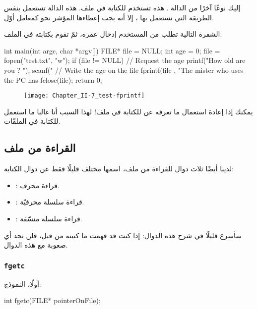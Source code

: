 إليك نوعًا آخرًا من الدالة
.
هذه تستخدم للكتابة في ملف. هذه الدالة تستعمل بنفس الطريقة التي نستعمل بها
،
إلا أنه يجب إعطاءها المؤشر نحو
كمعامل أوّل.

الشفرة التالية تطلب من المستخدم إدخال عمره، ثمّ تقوم بكتابته في الملف:

\begin{Csource}
int main(int argc, char *argv[])
{
	FILE* file = NULL;
	int age = 0;
	file = fopen("test.txt", "w");
	if (file != NULL)
	{
    		// Request the age
    		printf("How old are you ? ");
    		scanf("%
    		// Write the age on the file
    		fprintf(file , "The mister who uses the PC has %
    		fclose(file);
	}
 	return 0;
 }
\end{Csource}

\begin{figure}[H]
	\centering
	\texttt{[image: Chapter\_II-7\_test-fprintf]}
\end{figure}

يمكنك إذا إعادة استعمال ما تعرفه عن
للكتابة في ملف! لهذا السبب أنا غالبا ما استعمل
للكتابة في الملفّات.

\subsection{القراءة من ملف}

لدينا أيضًا ثلاث دوال للقراءة من ملف، اسمها مختلف قليلًا فقط عن دوال الكتابة:

\begin{itemize}
  \item {}:
 قراءة محرف.
  \item {}:
قراءة سلسلة محرفيّة.
  \item {}:
قراءة سلسلة منسّقة.
\end{itemize}

سأسرع قليلًا في شرح هذه الدوال: إذا كنت قد فهمت ما كتبته من قبل، فلن تجد أي صعوبة مع هذه الدوال.

\subsubsection{\texttt{fgetc}}
أولًا، النموذج:

\begin{Csource}
int fgetc(FILE* pointerOnFile);
\end{Csource}

